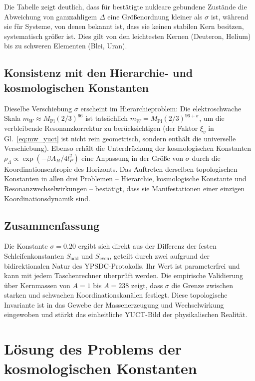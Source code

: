 \documentclass[11pt,a4paper]{article}
\theoremstyle{remark}
\begin{document}
	Die Tabelle zeigt deutlich, dass für bestätigte nukleare gebundene Zustände die Abweichung von ganzzahligem \(\Delta\) eine Größenordnung kleiner als \(\sigma\) ist, während sie für Systeme, von denen bekannt ist, dass sie keinen stabilen Kern besitzen, systematisch größer ist. Dies gilt von den leichtesten Kernen (Deuteron, Helium) bis zu schweren Elementen (Blei, Uran).
	
	\subsection{Konsistenz mit den Hierarchie- und kosmologischen Konstanten}
	
	Dieselbe Verschiebung \(\sigma\) erscheint im Hierarchieproblem: Die elektroschwache Skala \(m_W \approx M_{\mathrm{Pl}}(2/3)^{96}\) ist tatsächlich \(m_W = M_{\mathrm{Pl}} (2/3)^{96+\sigma}\), um die verbleibende Resonanzkorrektur zu berücksichtigen (der Faktor \(\xi_v\) in Gl.~\ref{eq:mw_yuct} ist nicht rein geometrisch, sondern enthält die universelle Verschiebung). Ebenso erhält die Unterdrückung der kosmologischen Konstanten \(\rho_\Lambda \propto \exp(-\beta A_H/4l_P^2)\) eine Anpassung in der Größe von \(\sigma\) durch die Koordinationsentropie des Horizonts. Das Auftreten derselben topologischen Konstanten in allen drei Problemen – Hierarchie, kosmologische Konstante und Resonanzwechselwirkungen – bestätigt, dass sie Manifestationen einer einzigen Koordinationsdynamik sind.
	
	\subsection{Zusammenfassung}
	
	Die Konstante \(\sigma = 0.20\) ergibt sich direkt aus der Differenz der festen Schleifenkonstanten \(S_{\mathrm{odd}}\) und \(S_{\mathrm{even}}\), geteilt durch zwei aufgrund der bidirektionalen Natur des YPSDC-Protokolls. Ihr Wert ist parameterfrei und kann mit jedem Taschenrechner überprüft werden. Die empirische Validierung über Kernmassen von \(A=1\) bis \(A=238\) zeigt, dass \(\sigma\) die Grenze zwischen starken und schwachen Koordinationskanälen festlegt. Diese topologische Invariante ist in das Gewebe der Massenerzeugung und Wechselwirkung eingewoben und stärkt das einheitliche YUCT-Bild der physikalischen Realität.
	
	\section{Lösung des Problems der kosmologischen Konstanten}
	
\end{document}
